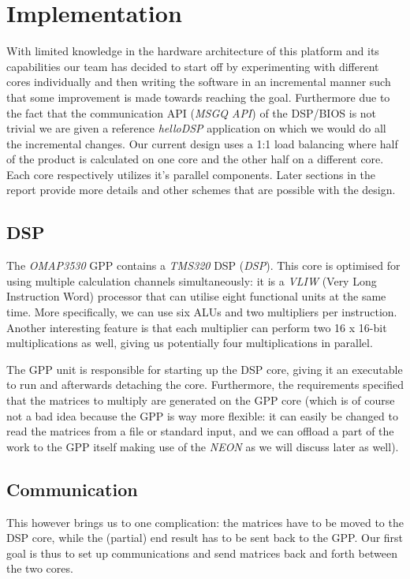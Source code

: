 \section{Implementation}
With limited knowledge in the hardware architecture of this platform and its capabilities our team has decided to start off by experimenting with different cores individually and then writing the software in an incremental manner such that some improvement is made towards reaching the goal. Furthermore due to the fact that the communication API (\emph{MSGQ API}) of the DSP/BIOS is not trivial we are given a reference \emph{helloDSP} application on which we would do all the incremental changes.
Our current design uses a 1:1 load balancing where half of the product is calculated on one core and the other half on a different core. Each core respectively utilizes it's parallel components. Later sections in the report provide more details and other schemes that are possible with the design.

\subsection{DSP}
The \emph{OMAP3530} GPP contains a \emph{TMS320} DSP (\emph{DSP})\cite{gpp-refman}. This
core is optimised for using multiple calculation channels simultaneously: it is
a \emph{VLIW} (Very Long Instruction Word) processor that can utilise eight
functional units at the same time. More specifically, we can use six ALUs and
two multipliers per instruction. Another interesting feature is that each
multiplier can perform two 16 x 16-bit multiplications as well\cite{dsp-refman}, giving us
potentially four multiplications in parallel.

The GPP unit is responsible for starting up the DSP core, giving it an executable to run
and afterwards detaching the core. Furthermore, the requirements specified
that the matrices to multiply are generated on the GPP core (which is
of course not a bad idea because the GPP is way more flexible: it can easily
be changed to read the matrices from a file or standard input, and we can
offload a part of the work to the GPP itself making use of the \emph{NEON} as we
will discuss later as well).

\subsection{Communication}
This however brings us to one complication: the matrices have to be moved to
the DSP core, while the (partial) end result has to be sent back to the GPP.
Our first goal is thus to set up communications and send matrices back and forth
between the two cores.

